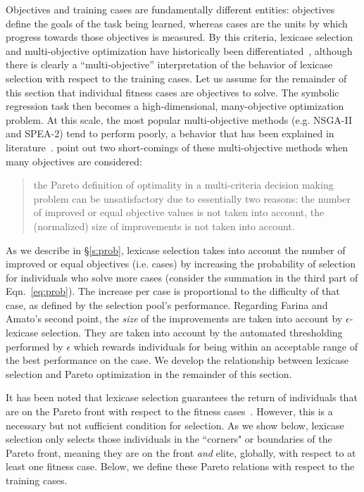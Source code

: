 \documentclass[twoside]{article}
\begin{document}
Objectives and training cases are fundamentally different entities: objectives define the goals of the task being learned, whereas cases are the units by which progress towards those objectives is measured. By this criteria, lexicase selection and multi-objective optimization have historically been differentiated~\citep{helmuth_general_2015}, although there is clearly a ``multi-objective'' interpretation of the behavior of lexicase selection with respect to the training cases. Let us assume for the remainder of this section that individual fitness cases are objectives to solve. The symbolic regression task then becomes a high-dimensional, many-objective optimization problem. At this scale, the most popular multi-objective methods (e.g. NSGA-II and SPEA-2) tend to perform poorly, a behavior that has been explained in literature~\citep{wagner_pareto-_2007, farina_optimal_2002}. \cite{farina_optimal_2002} point out two short-comings of these multi-objective methods when many objectives are considered: \begin{quote}
the Pareto definition of optimality in a multi-criteria decision making problem can be unsatisfactory due to essentially two reasons: the number of improved or equal objective values is not taken into account, the (normalized) size of improvements is not taken into account.
\end{quote}

As we describe in \S\ref{s:prob}, lexicase selection takes into account the number of improved or equal objectives (i.e. cases) by increasing the probability of selection for individuals who solve more cases (consider the summation in the third part of Eqn.~\ref{eq:prob}). The increase per case is proportional to the difficulty of that case, as defined by the selection pool's performance. Regarding Farina and Amato's second point, the {\it size} of the improvements are taken into account by $\epsilon$-lexicase selection. They are taken into account by the automated thresholding performed by $\epsilon$ which rewards individuals for being within an acceptable range of the best performance on the case. We develop the relationship between lexicase selection and Pareto optimization in the remainder of this section. 

It has been noted that lexicase selection guarantees the return of individuals that are on the Pareto front with respect to the fitness cases~\citep{la_cava_epsilon-lexicase_2016}. However, this is a necessary but not sufficient condition for selection. As we show below, lexicase selection only selects those individuals in the ``corners" or boundaries of the Pareto front, meaning they are on the front {\it and} elite, globally, with respect to at least one fitness case. Below, we define these Pareto relations with respect to the training cases. 
\end{document}
